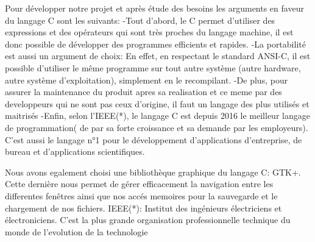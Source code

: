 \documentclass[a4]{article}
\begin{document}
Pour développer notre projet et après étude des besoins les arguments en faveur du langage C sont les suivants:
-Tout d'abord, le C permet d'utiliser des expressions et des opérateurs qui sont très proches du langage machine, 
il est donc possible de développer des programmes efficients et rapides.
-La portabilité est aussi un argument de choix: En effet, en respectant le standard ANSI-C, il est possible d'utiliser
le même programme sur tout autre système (autre hardware, autre système d'exploitation), simplement en le recompilant.
-De plus, pour assurer la maintenance du produit apres sa realisation et ce meme par des developpeurs qui ne sont
pas ceux d'origine, il faut un langage des plus utilisés et maitrisés
-Enfin, selon l'IEEE(*), le langage C est depuis 2016 le meilleur langage de 
programmation( de par sa forte croissance et sa demande par les employeurs). C'est aussi le langage n°1 pour le développement
d’applications d’entreprise, de bureau et d'applications scientifiques.

Nous avons egalement choisi une bibliothèque graphique du langage C: GTK+. Cette dernière nous permet de gérer efficacement
la navigation entre les differentes fenêtres
ainsi que nos accés memoires pour la sauvegarde et le chargement de nos fichiers. 
IEEE(*):  Institut des ingénieurs électriciens et électroniciens.
C'est la plus grande organisation professionnelle technique du monde de l'evolution de la technologie
\end{document}
